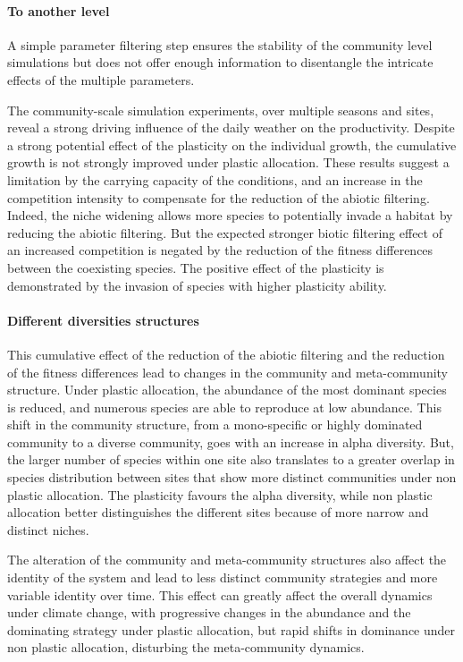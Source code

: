 \paragraph{To another level}

A simple parameter filtering step ensures the stability of the community level simulations but does not offer enough information to disentangle the intricate effects of the multiple parameters. 

The community-scale simulation experiments, over multiple seasons and sites, reveal a strong driving influence of the daily weather on the productivity. Despite a strong potential effect of the plasticity on the individual growth, the cumulative growth is not strongly improved under plastic allocation. These results suggest a limitation by the carrying capacity of the conditions, and an increase in the competition intensity to compensate for the reduction of the abiotic filtering. Indeed, the niche widening allows more species to potentially invade a habitat by reducing the abiotic filtering. But the expected stronger biotic filtering effect of an increased competition is negated by the reduction of the fitness differences between the coexisting species. The positive effect of the plasticity is demonstrated by the invasion of species with higher plasticity ability.


\paragraph{Different diversities structures}
This cumulative effect of the reduction of the abiotic filtering and the reduction of the fitness differences lead to changes in the community and meta-community structure. Under plastic allocation, the abundance of the most dominant species is reduced, and numerous species are able to reproduce at low abundance. This shift in the community structure, from a mono-specific or highly dominated community to a diverse community, goes with an increase in alpha diversity. But, the larger number of species within one site also translates to a greater overlap in species distribution between sites that show more distinct communities under non plastic allocation. The plasticity favours the alpha diversity, while non plastic allocation better distinguishes the different sites because of more narrow and distinct niches.

The alteration of the community and meta-community structures also affect the identity of the system and lead to less distinct community strategies and more variable identity over time. This effect can greatly affect the overall dynamics under climate change, with progressive changes in the abundance and the dominating strategy under plastic allocation, but rapid shifts in dominance under non plastic allocation, disturbing the meta-community dynamics.


